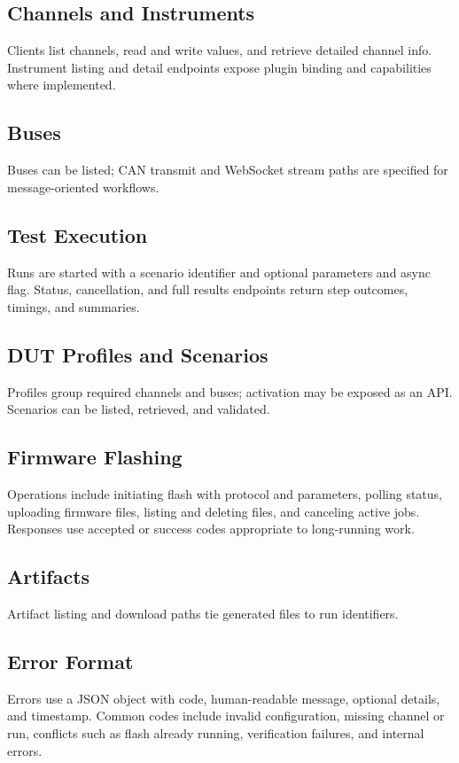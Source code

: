 \documentclass[conference]{IEEEtran}
\begin{document}
\subsection{Channels and Instruments}
Clients list channels, read and write values, and retrieve detailed channel info. Instrument listing and detail endpoints expose plugin binding and capabilities where implemented.

\subsection{Buses}
Buses can be listed; CAN transmit and WebSocket stream paths are specified for message-oriented workflows.

\subsection{Test Execution}
Runs are started with a scenario identifier and optional parameters and async flag. Status, cancellation, and full results endpoints return step outcomes, timings, and summaries.

\subsection{DUT Profiles and Scenarios}
Profiles group required channels and buses; activation may be exposed as an API. Scenarios can be listed, retrieved, and validated.

\subsection{Firmware Flashing}
Operations include initiating flash with protocol and parameters, polling status, uploading firmware files, listing and deleting files, and canceling active jobs. Responses use accepted or success codes appropriate to long-running work.

\subsection{Artifacts}
Artifact listing and download paths tie generated files to run identifiers.

\subsection{Error Format}
Errors use a JSON object with code, human-readable message, optional details, and timestamp. Common codes include invalid configuration, missing channel or run, conflicts such as flash already running, verification failures, and internal errors.
\end{document}
